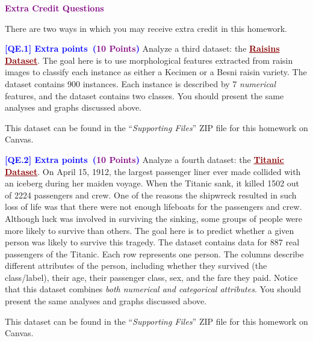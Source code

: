 \documentclass{article}
\newcommand{\HIGHLIGHT}[1]{\textcolor{blue}{\textbf{#1}}}
\newcommand{\POINTS}[1]{\textcolor{purple}{\textbf{{#1}}}}
\begin{document}
\newpage
\noindent \textcolor{purple}{\textbf{\Large{Extra Credit Questions}}}
\vspace{0.8cm}

\noindent There are two ways in which you may receive extra credit in this homework.
\vspace{0.75cm}



    \noindent \textbf{\HIGHLIGHT{[QE.1] Extra points~(\POINTS{10 Points})}} Analyze a third dataset: the \textcolor{darkred}{\textbf{\ul{Raisins Dataset}}}. The goal here is to use morphological features extracted from raisin images to classify each instance as either a Kecimen or a Besni raisin variety. The dataset contains 900 instances. Each instance is described by 7 \textit{numerical} features, and the dataset contains two classes. You should present the same analyses and graphs discussed above.
    \begin{mybox}[boxgray] 
    This dataset can be found in the ``\textit{Supporting Files}'' ZIP file for this homework on Canvas.
    \end{mybox}

    

    \vspace{1.0cm}
    \noindent \textbf{\HIGHLIGHT{[QE.2] Extra points~(\POINTS{10 Points})}} Analyze a fourth dataset: the \textcolor{darkred}{\textbf{\ul{Titanic Dataset}}}. On April 15, 1912, the largest passenger liner ever made collided with an iceberg during her maiden voyage. When the Titanic sank, it killed 1502 out of 2224 passengers and crew. One of the reasons the shipwreck resulted in such loss of life was that there were not enough lifeboats for the passengers and crew. Although luck was involved in surviving the sinking, some groups of people were more likely to survive than others. The goal here is to predict whether a given person was likely to survive this tragedy. The dataset contains data for 887 real passengers of the Titanic. Each row represents one person. The columns describe different attributes of the person, including whether they survived (the class/label), their age, their passenger class, sex, and the fare they paid. Notice that this dataset combines \textit{both numerical and categorical attributes}. You should present the same analyses and graphs discussed above.
    \begin{mybox}[boxgray] 
    This dataset can be found in the ``\textit{Supporting Files}'' ZIP file for this homework on Canvas.
    \end{mybox}
\end{document}
